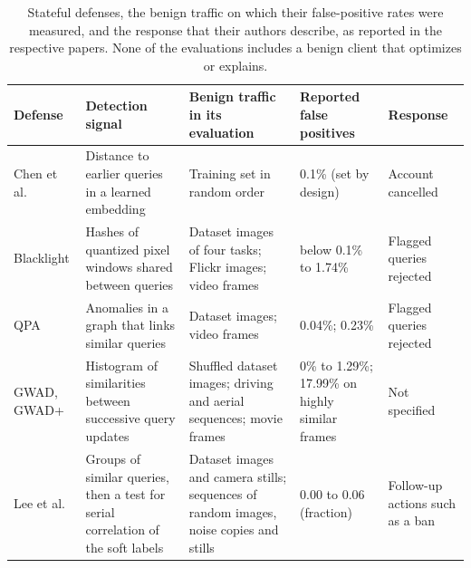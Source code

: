 \begin{table}[!tbp]
\centering\footnotesize\setlength{\tabcolsep}{3pt}
\caption{Stateful defenses, the benign traffic on which their false-positive rates were measured, and the response
that their authors describe, as reported in the respective papers. None of the evaluations includes a benign client
that optimizes or explains.}
\label{tab:defenses}
\begin{tabular}{L{1.6cm}L{3.1cm}L{4.3cm}L{1.7cm}L{1.8cm}}
\toprule
Defense & Detection signal & Benign traffic in its evaluation & Reported false positives & Response \\
\midrule
Chen et al. \cite{chen2020stateful} & Distance to earlier queries in a learned embedding &
Training set in random order & 0.1\% (set by design) & Account cancelled \\[2pt]
Blacklight \cite{li2022blacklight} & Hashes of quantized pixel windows shared between queries &
Dataset images of four tasks; Flickr images; video frames & below 0.1\% to 1.74\% & Flagged queries rejected \\[2pt]
QPA \cite{li2025qpa} & Anomalies in a graph that links similar queries &
Dataset images; video frames & 0.04\%; 0.23\% & Flagged queries rejected \\[2pt]
GWAD, GWAD+ \cite{park2025gwad} & Histogram of similarities between successive query updates &
Shuffled dataset images; driving and aerial sequences; movie frames & 0\% to 1.29\%; 17.99\% on highly similar frames & Not specified \\[2pt]
Lee et al. \cite{lee2026softlabel} & Groups of similar queries, then a test for serial correlation of the soft labels &
Dataset images and camera stills; sequences of random images, noise copies and stills & 0.00 to 0.06 (fraction) & Follow-up actions such as a ban \\
\bottomrule
\end{tabular}
\end{table}
